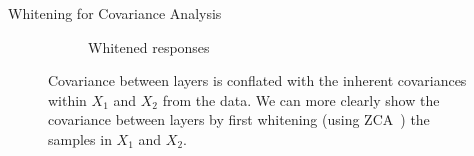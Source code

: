 \documentclass[t,xcolor=dvipsnames]{beamer}
\begin{document}
\begin{frame}{Whitening for Covariance Analysis}
\begin{figure}[tbp]
\begin{subfigure}[b]{0.45\linewidth}
    \caption{Whitened responses}
    \label{fig:whitened}
\end{subfigure}
\caption{Covariance between layers is conflated with the inherent covariances within $X_1$ and $X_2$ from the data. We can more clearly show the covariance between layers by first whitening (using ZCA~\cite{CIFAR10}) the samples in $X_1$ and $X_2$.}
\label{fig:whitevsnot}
\end{figure}
\end{frame}
\end{document}
